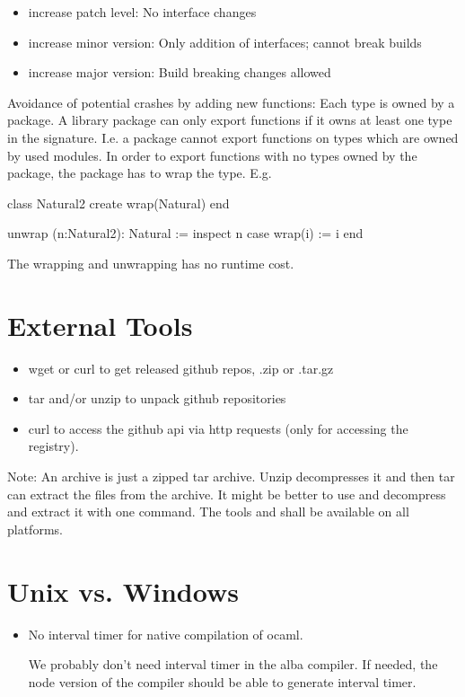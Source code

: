 \begin{itemize}
\item increase patch level: No interface changes
\item increase minor version: Only addition of interfaces; cannot break builds
\item increase major version: Build breaking changes allowed
\end{itemize}

Avoidance of potential crashes by adding new functions: Each type is owned by
a package. A library package can only export functions if it owns at least one
type in the signature. I.e. a package cannot export functions on types which
are owned by used modules. In order to export functions with no types owned by
the package, the package has to wrap the type. E.g.

\begin{alba}
class Natural2 create
    wrap(Natural)
end

unwrap (n:Natural2): Natural :=
    inspect n case
        wrap(i) := i
    end
\end{alba}
%
The wrapping and unwrapping has no runtime cost.


\section{External Tools}

\begin{itemize}
\item wget or curl to get released github repos, .zip or .tar.gz
\item tar and/or unzip to unpack github repositories
\item curl to access the github api via http requests (only for accessing the
  registry).
\end{itemize}

Note: An archive  is just a zipped tar archive. Unzip
decompresses it and then tar can extract the files from the archive. It might
be better to use  and decompress and extract it with one
command. The tools  and  shall be available on all
platforms.



\newpage
\section{Unix vs. Windows}

\begin{itemize}
\item No interval timer for native compilation of ocaml.

  We probably don't need interval timer in the alba compiler. If needed, the
  node version of the compiler should be able to generate interval timer.

\end{itemize}






